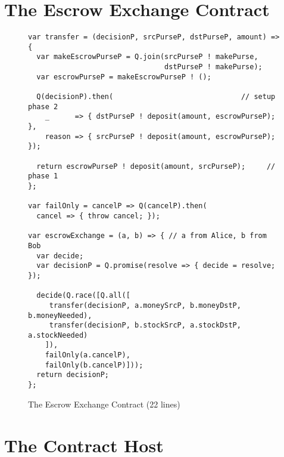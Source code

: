 \documentclass{llncs}
\begin{document}
\section{The Escrow Exchange Contract}

\begin{figure}[htbp]
\begin{center}
\begin{verbatim}
var transfer = (decisionP, srcPurseP, dstPurseP, amount) => {
  var makeEscrowPurseP = Q.join(srcPurseP ! makePurse, 
                                dstPurseP ! makePurse);
  var escrowPurseP = makeEscrowPurseP ! ();

  Q(decisionP).then(                              // setup phase 2
    _      => { dstPurseP ! deposit(amount, escrowPurseP); },
    reason => { srcPurseP ! deposit(amount, escrowPurseP); });

  return escrowPurseP ! deposit(amount, srcPurseP);     // phase 1
};

var failOnly = cancelP => Q(cancelP).then(
  cancel => { throw cancel; });

var escrowExchange = (a, b) => { // a from Alice, b from Bob
  var decide;
  var decisionP = Q.promise(resolve => { decide = resolve; });

  decide(Q.race([Q.all([
     transfer(decisionP, a.moneySrcP, b.moneyDstP, b.moneyNeeded),
     transfer(decisionP, b.stockSrcP, a.stockDstP, a.stockNeeded)
    ]), 
    failOnly(a.cancelP), 
    failOnly(b.cancelP)]));
  return decisionP;
};
\end{verbatim}
\caption{The Escrow Exchange Contract (22 lines)}
\label{escrowExchange}
\end{center}
\end{figure}



\section{The Contract Host}
\end{document}
